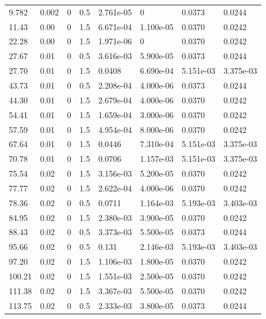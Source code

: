 \documentclass[preview]{standalone}
\begin{document}
{{\begin{tabular}{L{1.2cm}C{1.2cm} C{0.3cm}C{0.5cm} C{1.4cm}C{1.4cm} C{1.4cm}C{1.4cm}}
  9.782  &  0.002  & 0     & 0.5 &  2.761e-05  & 0  & 0.0373 &  0.0244   \\ 
  11.43  &  0.00  & 0     & 1.5 &  6.671e-04  & 1.100e-05  & 0.0370 &  0.0242   \\ 
  22.28  &  0.00  & 0     & 1.5 &  1.971e-06  & 0  & 0.0370 &  0.0242   \\ 
  27.67  &  0.01  & 0     & 0.5 &  3.616e-03  & 5.900e-05  & 0.0373 &  0.0244   \\ 
  27.70  &  0.01  & 0     & 1.5 &  0.0408  & 6.690e-04  & 5.151e-03 &  3.375e-03   \\ 
  43.73  &  0.01  & 0     & 0.5 &  2.208e-04  & 4.000e-06  & 0.0373 &  0.0244   \\ 
  44.30  &  0.01  & 0     & 1.5 &  2.679e-04  & 4.000e-06  & 0.0370 &  0.0242   \\ 
  54.41  &  0.01  & 0     & 1.5 &  1.659e-04  & 3.000e-06  & 0.0370 &  0.0242   \\ 
  57.59  &  0.01  & 0     & 1.5 &  4.954e-04  & 8.000e-06  & 0.0370 &  0.0242   \\ 
  67.64  &  0.01  & 0     & 1.5 &  0.0446  & 7.310e-04  & 5.151e-03 &  3.375e-03   \\ 
  70.78  &  0.01  & 0     & 1.5 &  0.0706  & 1.157e-03  & 5.151e-03 &  3.375e-03   \\ 
  75.54  &  0.02  & 0     & 1.5 &  3.156e-03  & 5.200e-05  & 0.0370 &  0.0242   \\ 
  77.77  &  0.02  & 0     & 1.5 &  2.622e-04  & 4.000e-06  & 0.0370 &  0.0242   \\ 
  78.36  &  0.02  & 0     & 0.5 &  0.0711  & 1.164e-03  & 5.193e-03 &  3.403e-03   \\ 
  84.95  &  0.02  & 0     & 1.5 &  2.380e-03  & 3.900e-05  & 0.0370 &  0.0242   \\ 
  88.43  &  0.02  & 0     & 0.5 &  3.373e-03  & 5.500e-05  & 0.0373 &  0.0244   \\ 
  95.66  &  0.02  & 0     & 0.5 &  0.131  & 2.146e-03  & 5.193e-03 &  3.403e-03   \\ 
  97.20  &  0.02  & 0     & 1.5 &  1.106e-03  & 1.800e-05  & 0.0370 &  0.0242   \\ 
  100.21  &  0.02  & 0     & 1.5 &  1.551e-03  & 2.500e-05  & 0.0370 &  0.0242   \\ 
  111.38  &  0.02  & 0     & 1.5 &  3.367e-03  & 5.500e-05  & 0.0370 &  0.0242   \\ 
  113.75  &  0.02  & 0     & 0.5 &  2.333e-03  & 3.800e-05  & 0.0373 &  0.0244   \\ 

\end{tabular}}}
\end{document}
